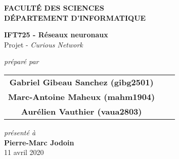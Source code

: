 \documentclass[letterpaper, 12pt]{article}
\begin{document}
    \begin{titlepage}
        \begin{center}
            \begin{large}
                \textbf{FACULTÉ DES SCIENCES} \\
                \textbf{DÉPARTEMENT D'INFORMATIQUE}
            \end{large}
            \vfill
            \begin{Large}
                \textbf{IFT725 - Réseaux neuronaux} \\
                Projet - \textit{Curious Network}
            \end{Large}
            \vfill
            \textit{préparé par} \\
            \begin{tabular}{ccc}
                \textbf{Gabriel Gibeau Sanchez (gibg2501)} \\
                \textbf{Marc-Antoine Maheux (mahm1904)} \\
                \textbf{Aurélien Vauthier (vaua2803)}
            \end{tabular}
            \vfill
            \textit{présenté à} \\
            \textbf{Pierre-Marc Jodoin} \\
            \vfill
            11 avril 2020
        \end{center}
    \end{titlepage}
    \pagebreak
    
    
    \tableofcontents
    \pagebreak
    
    \renewcommand{\figurename}{Figure}
    \renewcommand{\cftfigpresnum}{Figure }
    \renewcommand{\cftfignumwidth}{2cm}
    \listoffigures
    \pagebreak
%    
    \renewcommand{\tablename}{Tableau}
    \renewcommand{\cfttabpresnum}{Tableau }
    \renewcommand{\cfttabnumwidth}{2cm}
    \listoftables
    \pagebreak
    
    
    
    
    
    
    
    
    
\end{document}
